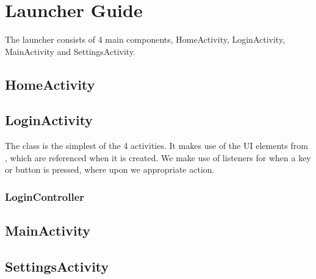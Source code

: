 \chapter{Launcher Guide}

The launcher consists of 4 main components, HomeActivity, LoginActivity,
MainActivity and SettingsActivity. 

\section{HomeActivity}

\section{LoginActivity}

The  class is the simplest of the 4 activities. It makes
use of the UI elements from , which are
referenced when it is created. We make use of listeners for when a key or
button is pressed, where upon we appropriate action. 

\subsection{LoginController}


\section{MainActivity}

\section{SettingsActivity}
